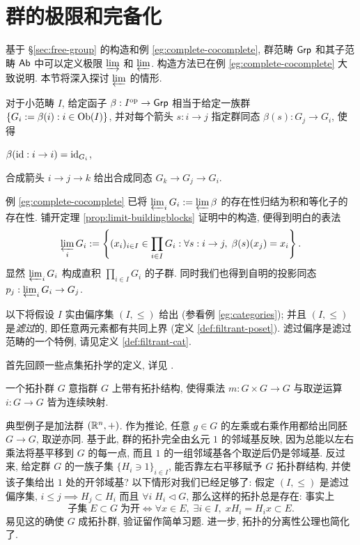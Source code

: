 \section{群的极限和完备化}\label{sec:group-limit}
基于 \S\ref{sec:free-group} 的构造和例 \ref{eg:complete-cocomplete}, 群范畴 $\mathsf{Grp}$ 和其子范畴 $\mathsf{Ab}$ 中可以定义极限 $\varinjlim$ 和 $\varprojlim$. 构造方法已在例 \ref{eg:complete-cocomplete} 大致说明. 本节将深入探讨 $\varprojlim$ 的情形.

对于小范畴 $I$, 给定函子 $\beta: I^\text{op} \to \mathsf{Grp}$ 相当于给定一族群 $\{ G_i := \beta(i) : i \in \operatorname{Ob}(I) \}$, 并对每个箭头 $s: i \to j$ 指定群同态 $\beta(s): G_j \to G_i$, 使得
\begin{compactitem}
	\item $\beta(\mathrm{id}: i \to i)=\mathrm{id}_{G_i}$,
	\item 合成箭头 $i \to j \to k$ 给出合成同态 $G_k \to G_j \to G_i$.
\end{compactitem}
例 \ref{eg:complete-cocomplete} 已将 $\varprojlim_i G_i := \varprojlim \beta$ 的存在性归结为积和等化子的存在性. 铺开定理 \ref{prop:limit-buildingblocks} 证明中的构造, 便得到明白的表法
\[
	\varprojlim_i G_i := \left\{ (x_i)_{i \in I} \in \prod_{i \in I} G_i : \forall s: i \to j, \; \beta(s)(x_j) = x_i \right\}.
\]
显然 $\varprojlim_i G_i$ 构成直积 $\prod_{i \in I} G_i$ 的子群. 同时我们也得到自明的投影同态 $p_j: \varprojlim_i G_i \to G_j$.

以下将假设 $I$ 实由偏序集 $(I, \leq)$ 给出 (参看例 \ref{eg:categories}); 并且 $(I, \leq)$ 是\emph{滤过}的, 即任意两元素都有共同上界 (定义 \ref{def:filtrant-poset}). 滤过偏序是滤过范畴的一个特例, 请见定义 \ref{def:filtrant-cat}.

首先回顾一些点集拓扑学的定义, 详见 \cite[第一章]{FL14}.
\begin{definition}\label{def:topological-group}
	一个拓扑群 $G$ 意指群 $G$ 上带有拓扑结构, 使得乘法 $m: G \times G \to G$ 与取逆运算 $i: G \to G$ 皆为连续映射.
\end{definition}
典型例子是加法群 $(\mathbb{R}^n, +)$. 作为推论, 任意 $g \in G$ 的左乘或右乘作用都给出同胚 $G \to G$, 取逆亦同. 基于此, 群的拓扑完全由幺元 $1$ 的邻域基反映, 因为总能以左右乘法将基平移到 $G$ 的每一点, 而且 $1$ 的一组邻域基各个取逆后仍是邻域基. 反过来, 给定群 $G$ 的一族子集 $\{H_i \ni 1\}_{i \in I}$, 能否靠左右平移赋予 $G$ 拓扑群结构, 并使该子集给出 $1$ 处的开邻域基? 以下情形对我们已经足够了: 假定 $(I, \leq)$ 是滤过偏序集, $i \leq j \implies H_j \subset H_i$ 而且 $\forall i \; H_i \lhd G$, 那么这样的拓扑总是存在: 事实上
\[ \text{子集}\; E \subset G\; \text{为开} \iff \forall x \in E, \; \exists i \in I, \; xH_i = H_i x \subset E. \]
易见这的确使 $G$ 成拓扑群, 验证留作简单习题. 进一步, 拓扑的分离性公理也简化了.

